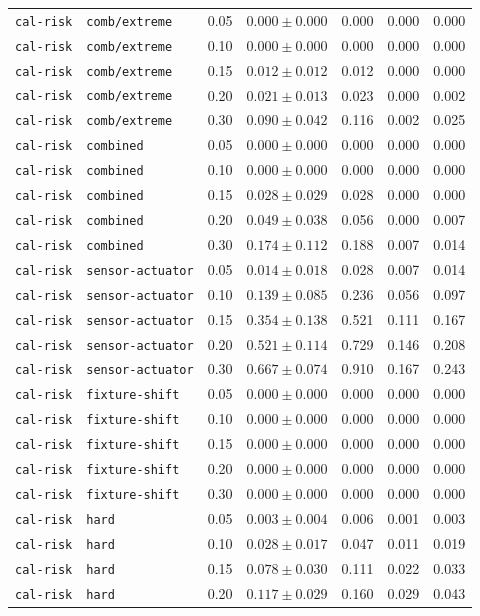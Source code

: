 \documentclass{article}
\begin{document}
\begin{center}
\begin{tabular}{lllcccc}
\texttt{cal-risk} & \texttt{comb/extreme} & 0.05 & $0.000 \pm 0.000$ & 0.000 & 0.000 & 0.000 \\
\texttt{cal-risk} & \texttt{comb/extreme} & 0.10 & $0.000 \pm 0.000$ & 0.000 & 0.000 & 0.000 \\
\texttt{cal-risk} & \texttt{comb/extreme} & 0.15 & $0.012 \pm 0.012$ & 0.012 & 0.000 & 0.000 \\
\texttt{cal-risk} & \texttt{comb/extreme} & 0.20 & $0.021 \pm 0.013$ & 0.023 & 0.000 & 0.002 \\
\texttt{cal-risk} & \texttt{comb/extreme} & 0.30 & $0.090 \pm 0.042$ & 0.116 & 0.002 & 0.025 \\
\texttt{cal-risk} & \texttt{combined} & 0.05 & $0.000 \pm 0.000$ & 0.000 & 0.000 & 0.000 \\
\texttt{cal-risk} & \texttt{combined} & 0.10 & $0.000 \pm 0.000$ & 0.000 & 0.000 & 0.000 \\
\texttt{cal-risk} & \texttt{combined} & 0.15 & $0.028 \pm 0.029$ & 0.028 & 0.000 & 0.000 \\
\texttt{cal-risk} & \texttt{combined} & 0.20 & $0.049 \pm 0.038$ & 0.056 & 0.000 & 0.007 \\
\texttt{cal-risk} & \texttt{combined} & 0.30 & $0.174 \pm 0.112$ & 0.188 & 0.007 & 0.014 \\
\texttt{cal-risk} & \texttt{sensor-actuator} & 0.05 & $0.014 \pm 0.018$ & 0.028 & 0.007 & 0.014 \\
\texttt{cal-risk} & \texttt{sensor-actuator} & 0.10 & $0.139 \pm 0.085$ & 0.236 & 0.056 & 0.097 \\
\texttt{cal-risk} & \texttt{sensor-actuator} & 0.15 & $0.354 \pm 0.138$ & 0.521 & 0.111 & 0.167 \\
\texttt{cal-risk} & \texttt{sensor-actuator} & 0.20 & $0.521 \pm 0.114$ & 0.729 & 0.146 & 0.208 \\
\texttt{cal-risk} & \texttt{sensor-actuator} & 0.30 & $0.667 \pm 0.074$ & 0.910 & 0.167 & 0.243 \\
\texttt{cal-risk} & \texttt{fixture-shift} & 0.05 & $0.000 \pm 0.000$ & 0.000 & 0.000 & 0.000 \\
\texttt{cal-risk} & \texttt{fixture-shift} & 0.10 & $0.000 \pm 0.000$ & 0.000 & 0.000 & 0.000 \\
\texttt{cal-risk} & \texttt{fixture-shift} & 0.15 & $0.000 \pm 0.000$ & 0.000 & 0.000 & 0.000 \\
\texttt{cal-risk} & \texttt{fixture-shift} & 0.20 & $0.000 \pm 0.000$ & 0.000 & 0.000 & 0.000 \\
\texttt{cal-risk} & \texttt{fixture-shift} & 0.30 & $0.000 \pm 0.000$ & 0.000 & 0.000 & 0.000 \\
\texttt{cal-risk} & \texttt{hard} & 0.05 & $0.003 \pm 0.004$ & 0.006 & 0.001 & 0.003 \\
\texttt{cal-risk} & \texttt{hard} & 0.10 & $0.028 \pm 0.017$ & 0.047 & 0.011 & 0.019 \\
\texttt{cal-risk} & \texttt{hard} & 0.15 & $0.078 \pm 0.030$ & 0.111 & 0.022 & 0.033 \\
\texttt{cal-risk} & \texttt{hard} & 0.20 & $0.117 \pm 0.029$ & 0.160 & 0.029 & 0.043 \\
\bottomrule
\end{tabular}
\end{center}
\end{document}
